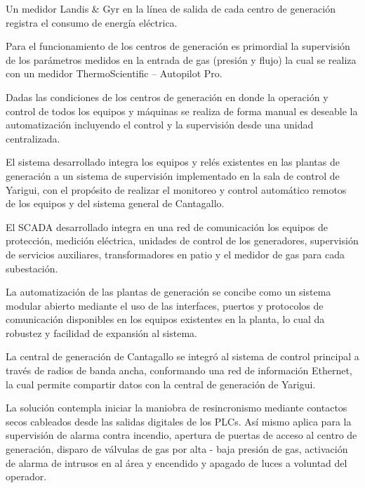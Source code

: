 Un medidor Landis \& Gyr en la línea de salida de cada centro de generación registra el consumo de energía eléctrica.

Para el funcionamiento de los centros de generación es primordial la supervisión de los parámetros medidos en la entrada de gas (presión y flujo) la cual se realiza con un medidor ThermoScientific – Autopilot Pro.

Dadas las condiciones de los centros de generación en donde la operación y control de todos los equipos y máquinas se realiza de forma manual es deseable la automatización incluyendo el control y la supervisión desde una unidad centralizada.

El sistema desarrollado integra los equipos y relés existentes en las plantas de generación a un sistema de supervisión implementado en la sala de control de Yarigui, con el propósito de realizar el monitoreo y control automático remotos de los equipos y del sistema general de Cantagallo.

El SCADA desarrollado integra en una red de comunicación los equipos de protección, medición eléctrica, unidades de control de los generadores, supervisión de servicios auxiliares, transformadores en patio y el medidor de gas para cada subestación.

La automatización de las plantas de generación se concibe como un sistema modular abierto  mediante el uso de las interfaces, puertos y protocolos de comunicación disponibles en los equipos existentes en la planta, lo cual da robustez y facilidad de expansión al sistema.

La central de generación de Cantagallo se integró al sistema de control principal a través de radios de banda ancha, conformando una red de información Ethernet, la cual permite compartir datos con la central de generación de Yarigui.

La solución contempla iniciar la maniobra de resincronismo mediante contactos secos cableados  desde las salidas digitales de los PLCs. Así mismo aplica para la supervisión de alarma contra incendio, apertura de puertas de acceso al centro de generación, disparo de válvulas de gas por alta - baja presión de gas, activación de alarma de intrusos en al área y encendido y apagado de luces a voluntad del operador.

